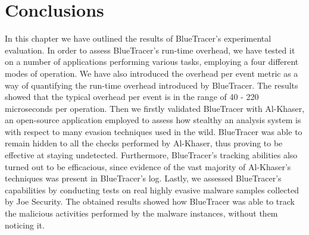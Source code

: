\section{Conclusions}
In this chapter we have outlined the results of BlueTracer's experimental evaluation. In order to assess BlueTracer's run-time overhead, we have tested it on a number of applications performing various tasks, employing a four different modes of operation. We have also introduced the overhead per event metric as a way of quantifying the run-time overhead introduced by BlueTracer. The results showed that the typical overhead per event is in the range of 40 - 220 microseconds per operation.
Then we firstly validated BlueTracer with Al-Khaser, an open-source application employed to assess how stealthy an analysis system is with respect to many evasion techniques used in the wild. BlueTracer was able to remain hidden to all the checks performed by Al-Khaser, thus proving to be effective at staying undetected. Furthermore, BlueTracer's tracking abilities also turned out to be efficacious, since evidence of the vast majority of Al-Khaser's techniques was present in BlueTracer's log. Lastly, we assessed BlueTracer's capabilities by conducting tests on real highly evasive malware samples collected by Joe Security. The obtained results showed how BlueTracer was able to track the malicious activities performed by the malware instances, without them noticing it.